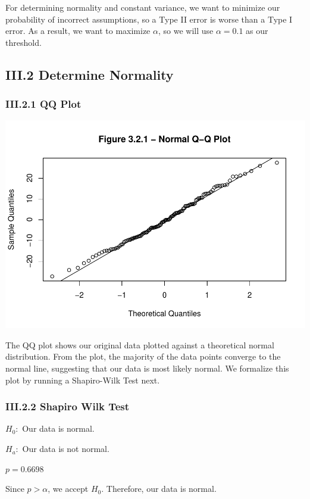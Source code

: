 \documentclass[
]{article}
\begin{document}
For determining normality and constant variance, we want to minimize our
probability of incorrect assumptions, so a Type II error is worse than a
Type I error. As a result, we want to maximize \(\alpha\), so we will
use \(\alpha = 0.1\) as our threshold.

\subsection{III.2 Determine Normality}\label{iii.2-determine-normality}

\subsubsection{III.2.1 QQ Plot}\label{iii.2.1-qq-plot}

\includegraphics{STA_106_Project_2_files/figure-latex/unnamed-chunk-4-1.pdf}

The QQ plot shows our original data plotted against a theoretical normal
distribution. From the plot, the majority of the data points converge to
the normal line, suggesting that our data is most likely normal. We
formalize this plot by running a Shapiro-Wilk Test next.

\subsubsection{III.2.2 Shapiro Wilk
Test}\label{iii.2.2-shapiro-wilk-test}

\(H_0:\) Our data is normal.

\(H_a:\) Our data is not normal.

\(p = 0.6698\)

Since \(p > \alpha\), we accept \(H_0\). Therefore, our data is normal.
\end{document}
